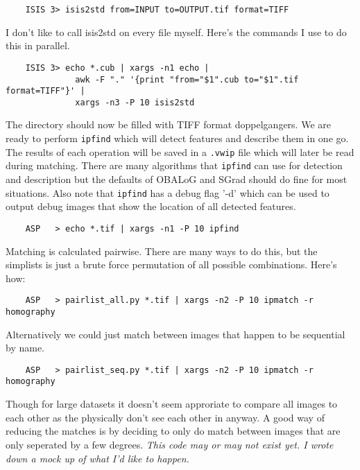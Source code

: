 \begin{verbatim}
    ISIS 3> isis2std from=INPUT to=OUTPUT.tif format=TIFF
\end{verbatim}

I don't like to call isis2std on every file myself. Here's the
commands I use to do this in parallel.

\begin{verbatim}
    ISIS 3> echo *.cub | xargs -n1 echo |
              awk -F "." '{print "from="$1".cub to="$1".tif format=TIFF"}' |
              xargs -n3 -P 10 isis2std
\end{verbatim}

The directory should now be filled with TIFF format doppelgangers. We
are ready to perform \texttt{ipfind} which will detect features and
describe them in one go. The results of each operation will be saved
in a \texttt{.vwip} file which will later be read during
matching. There are many algorithms that \texttt{ipfind} can use for
detection and description but the defaults of OBALoG and SGrad should
do fine for most situations. Also note that \texttt{ipfind} has a
debug flag '-d' which can be used to output debug images that show the
location of all detected features.

\begin{verbatim}
    ASP   > echo *.tif | xargs -n1 -P 10 ipfind
\end{verbatim}

Matching is calculated pairwise. There are many ways to do this, but
the simplists is just a brute force permutation of all possible
combinations. Here's how:

\begin{verbatim}
    ASP   > pairlist_all.py *.tif | xargs -n2 -P 10 ipmatch -r homography
\end{verbatim}

Alternatively we could just match between images that happen to be
sequential by name.

\begin{verbatim}
    ASP   > pairlist_seq.py *.tif | xargs -n2 -P 10 ipmatch -r homography
\end{verbatim}

Though for large datasets it doesn't seem approriate to compare all
images to each other as the physically don't see each other in
anyway. A good way of reducing the matches is by deciding to only do
match between images that are only seperated by a few
degrees. \emph{This code may or may not exist yet. I wrote down a mock
  up of what I'd like to happen.}

